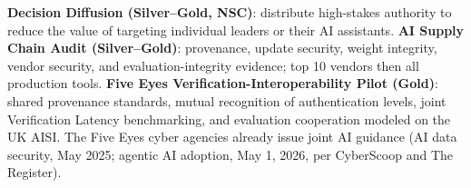 \documentclass[11pt,letterpaper]{article}
\begin{document}
\begin{recbox}
\textbf{Decision Diffusion (Silver--Gold, NSC)}: distribute high-stakes authority to reduce the value of targeting individual leaders or their AI assistants. \textbf{AI Supply Chain Audit (Silver--Gold)}: provenance, update security, weight integrity, vendor security, and evaluation-integrity evidence; top 10 vendors then all production tools. \textbf{Five Eyes Verification-Interoperability Pilot (Gold)}: shared provenance standards, mutual recognition of authentication levels, joint Verification Latency benchmarking, and evaluation cooperation modeled on the UK AISI. The Five Eyes cyber agencies already issue joint AI guidance (AI data security, May 2025; agentic AI adoption, May 1, 2026, per CyberScoop and The Register).
\end{recbox}
\end{document}
